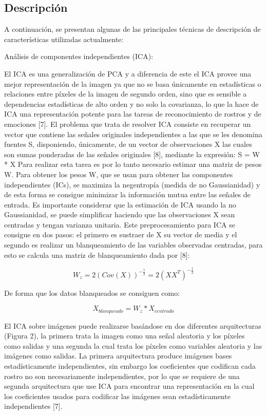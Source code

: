 \subsection{Descripción}
A continuación, se presentan algunas de las principales técnicas de descripción de características utilizadas actualmente:

\begin{enumerate}
{\bf\item Análisis de componentes independientes (ICA):} \vskip 0.1cm
El ICA es una generalización de PCA y a diferencia de este el ICA provee una mejor representación de la imagen ya que no se basa únicamente en estadísticas o relaciones entre píxeles de la imagen de segundo orden, sino que es sensible a dependencias estadísticas de alto orden y no solo la covarianza, lo que la hace de ICA una representación potente para las tareas de reconocimiento de rostros y de emociones [7]. 
\vskip 0.1cm
El problema que trata de resolver ICA consiste en recuperar un vector que contiene las señales originales independientes a las que se les denomina fuentes S, disponiendo, únicamente, de un vector de observaciones X las cuales son sumas ponderadas de las señales originales [8], mediante la expresión:  S = W * X
\vskip 0.1cm
Para realizar esta tarea es por lo tanto necesario estimar una matriz de pesos W. Para obtener los pesos W, que se usan para obtener las componentes independientes (ICs), se maximiza la negentropía (medida de no Gaussianidad) y de esta forma se consigue minimizar la información mutua entre las señales de entrada. Es importante considerar que la estimación de ICA usando la no Gaussianidad, se puede simplificar haciendo que las observaciones X sean centradas y tengan varianza unitaria. Este preprocesamiento para ICA se consigue en dos pasos: el primero es sustraer de X su vector de media y el segundo es realizar un blanqueamiento de las variables observadas centradas, para esto se calcula una matriz de blanqueamiento dada por [8]:

\begin{equation}
W_{z}={2(Cov(X))}^{-\frac{1}{2}}=2(XX^{T})^{-\frac{1}{2}}
\end{equation}

De forma que los datos blanqueados se consiguen como:

\begin{equation}
X_{blanqueado}=W_{z}*X_{centrado}
\end{equation}

El ICA sobre imágenes puede realizarse basándose en dos diferentes arquitecturas (Figura 2), la primera trata la imagen como una señal aleatoria y los píxeles como salidas y una segunda la cual trata los píxeles como variables aleatoria y las imágenes como salidas. La primera arquitectura produce imágenes bases estadísticamente independientes, sin embargo los coeficientes que codifican cada rostro no son necesariamente independientes, por lo que se requiere de una segunda arquitectura que use ICA para encontrar una representación en la cual los coeficientes usados para codificar las imágenes sean estadísticamente independientes [7].


\end{enumerate}
